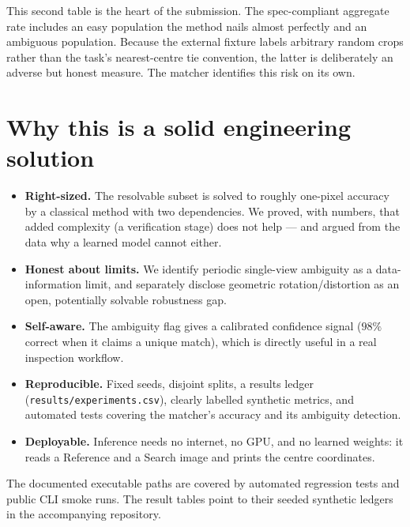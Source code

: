 \documentclass[11pt]{article}
\newcommand{\term}[1]{\textbf{\color{klablue}#1}}
\begin{document}
This second table is the heart of the submission. The spec-compliant aggregate
rate includes an easy population the method nails almost perfectly and an
ambiguous population. Because the external fixture labels arbitrary random crops
rather than the task's nearest-centre tie convention, the latter is deliberately
an adverse but honest measure. The matcher identifies this risk on its own.

\section{Why this is a solid engineering solution}

\begin{itemize}[leftmargin=1.4em]
  \item \term{Right-sized.} The resolvable subset is solved to roughly one-pixel accuracy by a
        classical method with two dependencies. We proved, with numbers, that
        added complexity (a verification stage) does not help --- and argued
        from the data why a learned model cannot either.
  \item \term{Honest about limits.} We identify periodic single-view ambiguity
        as a data-information limit, and separately disclose geometric
        rotation/distortion as an open, potentially solvable robustness gap.
  \item \term{Self-aware.} The ambiguity flag gives a calibrated confidence
        signal ($98\%$ correct when it claims a unique match), which is
        directly useful in a real inspection workflow.
  \item \term{Reproducible.} Fixed seeds, disjoint splits, a results ledger
        (\texttt{results/experiments.csv}), clearly labelled synthetic metrics,
        and automated tests covering the matcher's accuracy and its ambiguity
        detection.
  \item \term{Deployable.} Inference needs no internet, no GPU, and no learned
        weights: it reads a Reference and a Search image and prints the centre
        coordinates.
\end{itemize}

\vfill
\begin{center}
\color{klagrey}\small
The documented executable paths are covered by automated regression tests and
public CLI smoke runs. The result tables point to their seeded synthetic ledgers
in the accompanying repository.
\end{center}
\end{document}
